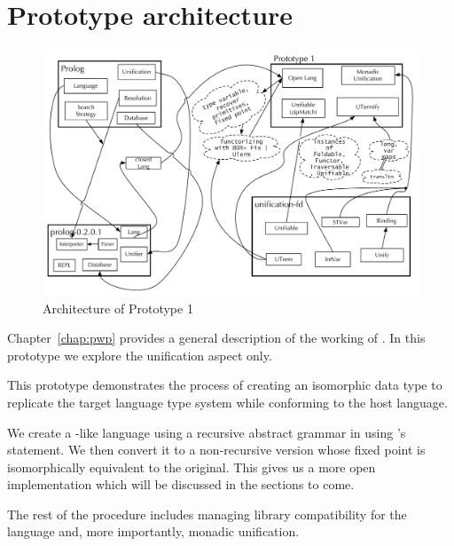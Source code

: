 \documentclass[thesis-solanki.tex]{subfiles}
\begin{document}
\section{Prototype architecture}

\begin{figure}[H]
  \includegraphics[width=1\textwidth]{Prototype-1.pdf}
  \caption{Architecture of Prototype 1}
  \label{fig:proto1-arch}
\end{figure}
Chapter~\ref{chap:pwp} provides a general description of the working of .
In this prototype we explore the unification aspect only.

This prototype demonstrates the process of creating an isomorphic data type to replicate the target language type
system while conforming to the host language.

We create a -like language using a recursive abstract grammar in  using
's   statement.
We then convert it to a non-recursive version whose fixed point is isomorphically equivalent to the original.
This gives us a more open implementation which will be discussed in the sections to come.

The rest of the procedure includes managing library compatibility for the language and, more importantly, monadic
unification.
\end{document}
